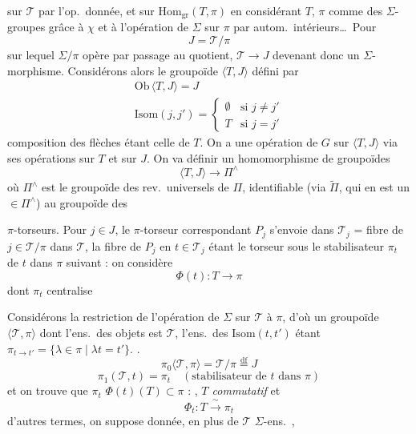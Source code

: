 \documentclass[11pt,a4paper]{article}
\begin{document}
sur $\mathcal{T}$ par l'op.\ donnée, et sur $\mathrm{Hom}_{\mathrm{gr}}(T, \pi)$ en
considérant $T$, $\pi$ comme des $\Sigma$-groupes grâce à $\chi$ et à
l'opération de $\Sigma$ sur $\pi$ par autom.\ intérieurs…\ Pour
\[
  J = \mathcal{T}/\pi
\]
sur lequel  $\Sigma/\pi$
opère par passage au quotient, $\mathcal{T} \to J$ devenant donc un
$\Sigma$-morphisme. Considérons alors le groupoïde $\langle T, J \rangle$
défini par
\[
  \begin{array}{l}
    \mathrm{Ob}\,\langle T, J \rangle = J \\
    \mathrm{Isom}(j, j') = \left\{
      \begin{array}{ll} \emptyset & \text{si } j \neq j' \\
        T & \text{si } j = j' \end{array}\right.
  \end{array}
\]
composition des flèches étant celle de $T$. On a une opération de $G$ sur
$\langle T, J \rangle$ via ses opérations sur $T$  et sur $J$. On va définir un homomorphisme de groupoïdes
\[
  \langle T, J \rangle \longrightarrow \Pi^{\wedge}
\]
où $\Pi^{\wedge}$ est le groupoïde  des
rev.\ universels de $\Pi$, identifiable (via $\widetilde{\Pi}$, qui en est un
$\in \Pi^{\wedge}$) au groupoïde des

$\pi$-torseurs. Pour $j \in J$, le $\pi$-torseur correspondant $P_j$ s'envoie
dans $\mathcal{T}_j$ = fibre de $j \in \mathcal{T}/\pi$ dans $\mathcal{T}$,
 la fibre de $P_j$ en $t \in \mathcal{T}_j$ étant le torseur sous
le stabilisateur $\pi_t$ de $t$ dans $\pi$ suivant : on considère
\[
  \Phi(t) : T \longrightarrow \pi
\]
dont $\pi_t$ centralise

Considérons la restriction de l'opération de $\Sigma$ sur $\mathcal{T}$ à
$\pi$, d'où un groupoïde $\langle \mathcal{T}, \pi \rangle$ dont l'ens.\ des
objets est $\mathcal{T}$, l'ens.\ des $\mathrm{Isom}(t, t')$ étant
$\pi_{t \to t'} = \{\lambda \in \pi \mid \lambda t = t'\}$.
 \ill{}.
\[
  \pi_0 \langle \mathcal{T}, \pi \rangle = \mathcal{T}/\pi \overset{\mathrm{df}}{=} J
\]
\[
  \pi_1(\mathcal{T}, t) = \pi_t \quad (\text{stabilisateur de } t \text{ dans } \pi)
\]
et on trouve que $\pi_t$  $\Phi(t)(T) \subset \pi$ : \ill{},
 \emph{$T$ commutatif}
et 
\[
  \Phi_t : T \xrightarrow{\ \sim\ } \pi_t
\]
 d'autres termes, on suppose donnée, en plus de $\mathcal{T}$
$\Sigma$-ens.\ ,
\end{document}
